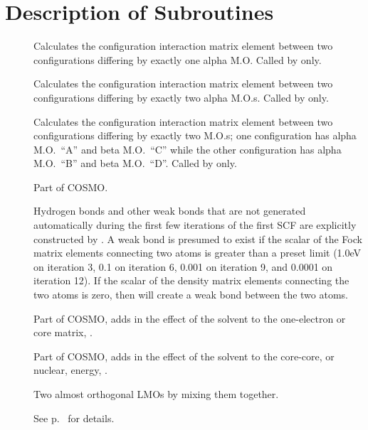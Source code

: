 \chapter{Description of Subroutines}
\begin{description}
\item[] Calculates the configuration interaction matrix element
between two configurations differing by exactly one alpha M.O.   Called by
 only.

\item[] Calculates the configuration interaction matrix element
between two configurations differing by exactly two alpha M.O.s. Called by
 only.

\item[] Calculates the configuration interaction matrix element
between two configurations differing by exactly two M.O.s; one configuration
has alpha M.O.\ ``A'' and beta M.O.\ ``C'' while the other configuration has
alpha M.O.\ ``B'' and beta M.O.\ ``D''.  Called by  only.

\item[] Part of COSMO.

\item[] Hydrogen bonds and other weak bonds that  are not generated
automatically during the first few iterations of the first SCF are explicitly
constructed by .  A weak bond is presumed to exist if the scalar of
the Fock matrix elements connecting two atoms is greater than a preset limit
(1.0eV on iteration 3, 0.1 on iteration 6, 0.001 on iteration 9, and 0.0001 on
iteration 12).  If the scalar of the density matrix elements connecting the two
atoms is zero, then  will create a weak bond between the two atoms.

\item[] Part of COSMO,  adds in the effect of the
solvent  to the one-electron or core matrix, .

\item[] Part of COSMO,  adds in the effect of the
solvent  to the core-core, or nuclear, energy, .

\item[] Two almost orthogonal LMOs  by mixing them together.  
\begin{latexonly}
See p.~\pageref{reorth} for details.
\end{latexonly}


\end{description}
